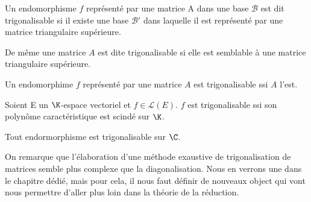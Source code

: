 
\begin{definition}[Trigonalisation]
    Un endomorphisme $f$ représenté par une matrice A dans une base $\mathcal{B}$ est dit trigonalisable si 
    il existe une base $\mathcal{B}'$ dans laquelle il est représenté par une matrice triangulaire supérieure. 

    \vspace{0.3cm}

    De même une matrice $A$ est dite trigonalisable si elle est semblable à une matrice triangulaire supérieure. 
\end{definition}

\begin{proposition}
    Un endomorphime $f$ représenté par une matrice $A$ est trigonalisable ssi $A$ l'est. 
\end{proposition}


\begin{criteria}
    Soient E un $\K$-espace vectoriel et $f \in \mathcal{L}(E)$. $f$ est trigonalisable ssi son polynôme caractéristique est scindé sur $\K$. 
\end{criteria}

\begin{corollary}[La puissance de $\C$]
    Tout endormorphisme est trigonalisable sur $\C$. 
\end{corollary}

On remarque que l'élaboration d'une méthode exaustive de trigonalisation de matrices semble plus complexe que la diagonalisation. 
Nous en verrons une dans le chapitre dédié, mais pour cela, il nous faut définir de nouveaux object qui vont nous permettre d'aller plus loin dans la théorie de la réduction. 

